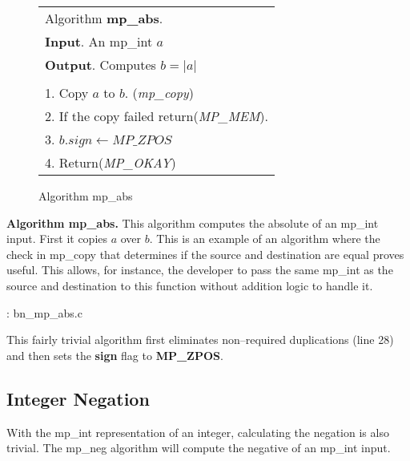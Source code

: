 \documentclass[b5paper]{book}
\begin{document}
\begin{figure}[here]
\begin{center}
\begin{tabular}{l}
\hline Algorithm \textbf{mp\_abs}. \\
\textbf{Input}.   An mp\_int $a$ \\
\textbf{Output}.  Computes $b = \vert a \vert$ \\
\hline \\
1.  Copy $a$ to $b$.  (\textit{mp\_copy}) \\
2.  If the copy failed return(\textit{MP\_MEM}). \\
3.  $b.sign \leftarrow MP\_ZPOS$ \\
4.  Return(\textit{MP\_OKAY}) \\
\hline
\end{tabular}
\end{center}
\caption{Algorithm mp\_abs}
\end{figure}

\textbf{Algorithm mp\_abs.}
This algorithm computes the absolute of an mp\_int input.  First it copies $a$ over $b$.  This is an example of an
algorithm where the check in mp\_copy that determines if the source and destination are equal proves useful.  This allows,
for instance, the developer to pass the same mp\_int as the source and destination to this function without addition 
logic to handle it.

\vspace{+3mm}\begin{small}
\hspace{-5.1mm}{\bf File}: bn\_mp\_abs.c
\vspace{-3mm}
\begin{alltt}
\end{alltt}
\end{small}

This fairly trivial algorithm first eliminates non--required duplications (line 28) and then sets the
\textbf{sign} flag to \textbf{MP\_ZPOS}.

\subsection{Integer Negation}
With the mp\_int representation of an integer, calculating the negation is also trivial.  The mp\_neg algorithm will compute
the negative of an mp\_int input.
\end{document}
